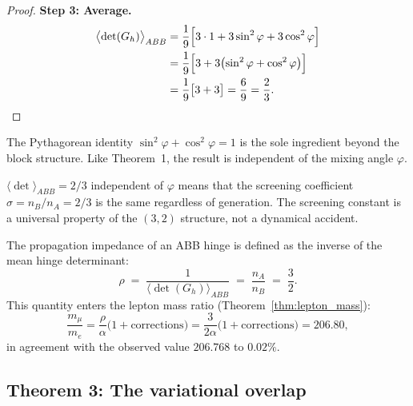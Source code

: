 \begin{proof}
\medskip\noindent\textbf{Step 3: Average.}
\begin{align}
\bigl\langle \det(G_h) \bigr\rangle_{ABB}
&= \frac{1}{9}\Bigl[3 \cdot 1 + 3\sin^2\varphi + 3\cos^2\varphi\Bigr]
\notag\\
&= \frac{1}{9}\Bigl[3 + 3\bigl(\sin^2\varphi + \cos^2\varphi\bigr)\Bigr]
\notag\\
&= \frac{1}{9}\bigl[3 + 3\bigr]
= \frac{6}{9} = \frac{2}{3}. \qedhere
\end{align}
\end{proof}

\begin{remark}[Universality]
The Pythagorean identity $\sin^2\varphi + \cos^2\varphi = 1$ is the
sole ingredient beyond the block structure.  Like Theorem~1, the
result is independent of the mixing angle $\varphi$.
\end{remark}

\begin{remark}
$\langle\det\rangle_{ABB} = 2/3$ independent of $\varphi$ means that the screening coefficient $\sigma = n_B/n_A = 2/3$ is the same regardless of generation.  The screening constant is a universal property of the $(3,2)$ structure, not a dynamical accident.
\end{remark}

\begin{corollary}\label{cor:impedance}
The propagation impedance of an ABB hinge is defined as the inverse of
the mean hinge determinant:
\begin{equation}
\rho \;=\; \frac{1}{\langle\det(G_h)\rangle_{ABB}}
\;=\; \frac{n_A}{n_B} \;=\; \frac{3}{2}.
\end{equation}
This quantity enters the lepton mass ratio
(Theorem~\ref{thm:lepton_mass}):
\begin{equation}
\frac{m_\mu}{m_e} = \frac{\rho}{\alpha}
\bigl(1 + \text{corrections}\bigr)
= \frac{3}{2\alpha}
\bigl(1 + \text{corrections}\bigr)
= 206.80,
\end{equation}
in agreement with the observed value $206.768$ to $0.02\%$.
\end{corollary}

\subsection{Theorem 3: The variational overlap}
\label{sec:thm_overlap}

